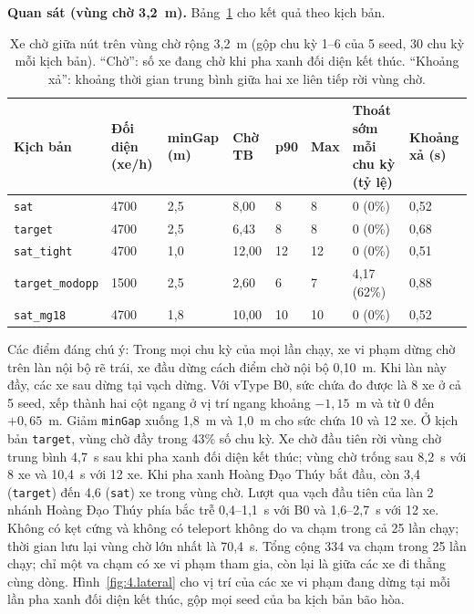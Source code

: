 \documentclass[../main.tex]{subfiles}
\begin{document}
\textbf{Quan sát (vùng chờ 3,2~m).} Bảng~\ref{table:4.box} cho kết quả theo kịch bản.

\begin{table}[H]
\centering
\small\setlength{\tabcolsep}{3pt}
\caption{Xe chờ giữa nút trên vùng chờ rộng 3,2~m (gộp chu kỳ 1--6 của 5 seed, 30 chu kỳ mỗi kịch bản). ``Chờ'': số xe đang chờ khi pha xanh đối diện kết thúc. ``Khoảng xả'': khoảng thời gian trung bình giữa hai xe liên tiếp rời vùng chờ.} \label{table:4.box}
\begin{tabular}{|p{2.3cm}|p{1.5cm}|p{1.3cm}|p{1.2cm}|p{0.9cm}|p{0.9cm}|p{2.4cm}|p{1.6cm}|}
\hline
\textbf{Kịch bản} & \textbf{Đối diện (xe/h)} & \textbf{minGap (m)} & \textbf{Chờ TB} & \textbf{p90} & \textbf{Max} & \textbf{Thoát sớm mỗi chu kỳ (tỷ lệ)} & \textbf{Khoảng xả (s)} \\ \hline
\texttt{sat} & 4700 & 2,5 & 8,00 & 8 & 8 & 0 (0\%) & 0,52 \\ \hline
\texttt{target} & 4700 & 2,5 & 6,43 & 8 & 8 & 0 (0\%) & 0,68 \\ \hline
\texttt{sat\_tight} & 4700 & 1,0 & 12,00 & 12 & 12 & 0 (0\%) & 0,51 \\ \hline
\texttt{target\_\allowbreak modopp} & 1500 & 2,5 & 2,60 & 6 & 7 & 4,17 (62\%) & 0,88 \\ \hline
\texttt{sat\_mg18} & 4700 & 1,8 & 10,00 & 10 & 10 & 0 (0\%) & 0,52 \\ \hline
\end{tabular}
\end{table}

Các điểm đáng chú ý: Trong mọi chu kỳ của mọi lần chạy, xe vi phạm dừng chờ trên làn nội bộ rẽ trái, xe đầu dừng cách điểm chờ nội bộ 0,10~m. Khi làn này đầy, các xe sau dừng tại vạch dừng. Với vType B0, sức chứa đo được là 8 xe ở cả 5 seed, xếp thành hai cột ngang ở vị trí ngang khoảng $-1{,}15$~m và từ 0 đến $+0{,}65$~m. Giảm \texttt{minGap} xuống 1,8~m và 1,0~m cho sức chứa 10 và 12 xe. Ở kịch bản \texttt{target}, vùng chờ đầy trong 43\% số chu kỳ. Xe chờ đầu tiên rời vùng chờ trung bình 4,7~s sau khi pha xanh đối diện kết thúc; vùng chờ trống sau 8,2~s với 8 xe và 10,4~s với 12 xe. Khi pha xanh Hoàng Đạo Thúy bắt đầu, còn 3,4 (\texttt{target}) đến 4,6 (\texttt{sat}) xe trong vùng chờ. Lượt qua vạch đầu tiên của làn 2 nhánh Hoàng Đạo Thúy phía bắc trễ 0,4--1,1~s với B0 và 1,6--2,7~s với 12 xe. Không có kẹt cứng và không có teleport không do va chạm trong cả 25 lần chạy; thời gian lưu lại vùng chờ lớn nhất là 70,4~s. Tổng cộng 334 va chạm trong 25 lần chạy; chỉ một va chạm có xe vi phạm tham gia, còn lại là giữa các xe đi thẳng cùng dòng.
Hình~\ref{fig:4.lateral} cho vị trí của các xe vi phạm đang dừng tại mỗi lần pha xanh đối diện kết thúc, gộp mọi seed của ba kịch bản bão hòa.
\end{document}
